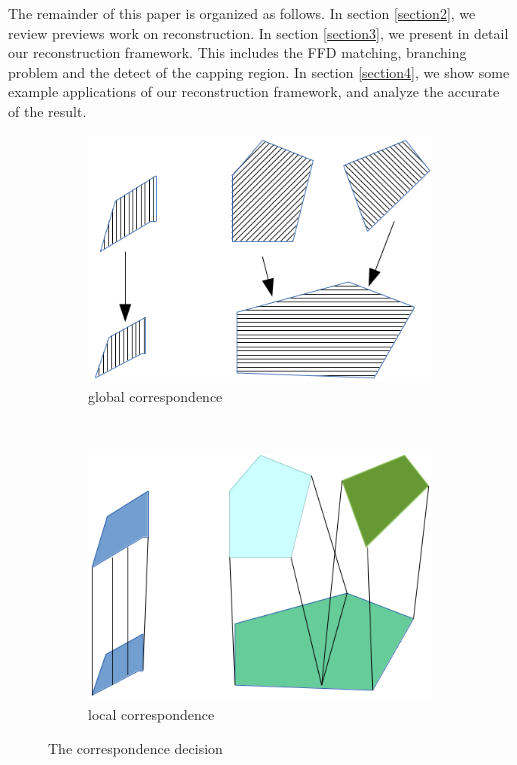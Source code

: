 \documentclass[3p,times]{elsarticle}
\begin{document}
The remainder of this paper is organized as follows. In section \ref{section2}, we
review previews work on reconstruction. In section \ref{section3}, we present in
detail our reconstruction framework. This includes the FFD matching,
branching problem and the detect of the capping region. In section
\ref{section4}, we show some example applications of our reconstruction framework, and analyze the accurate of the result.

\begin{figure}[ht]
\centering
\begin{subfigure}[b]{0.2\textwidth}
\includegraphics[width=\textwidth]{../picture/global.png}
\caption{global correspondence}
\label{fig:global}
\end{subfigure}%
~~~~~~~~~~~~~~~~~~~~~~~~~~~~~~~~~~~~~~~~~~~~%
\begin{subfigure}[b]{0.2\textwidth}
\includegraphics[width=\textwidth]{../picture/local.png}
\caption{local correspondence}
\label{fig:local}
\end{subfigure}

\caption{The correspondence decision}
\label{fig:the correspondence decision}
\end{figure}
\end{document}
